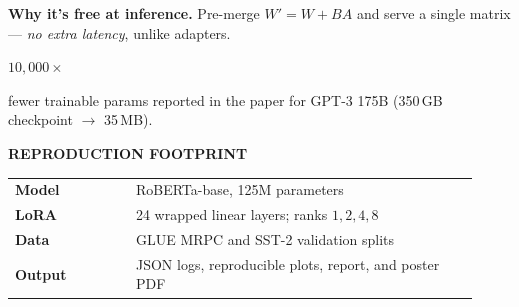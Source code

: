 \documentclass[landscape]{article}
\newcommand{\panelhead}[1]{%
  \par\vspace{2mm}%
  {\fontsize{15pt}{17pt}\selectfont\bfseries\color{slate}\MakeUppercase{#1}}\par
  \vspace{1mm}%
}
\newcommand{\bignum}[2]{%
  \begin{accentbox}\centering
    {\fontsize{42pt}{46pt}\selectfont\bfseries\color{accent}#1}\par
    \vspace{1mm}
    {\fontsize{14pt}{17pt}\selectfont #2}
  \end{accentbox}%
}
\begin{document}
\begin{minipage}[t]{0.323\textwidth}
\vspace{2mm}
\textbf{Why it's free at inference.} Pre-merge $W' = W + BA$ and serve a single matrix --- \emph{no extra latency}, unlike adapters.

\vspace{4mm}
\bignum{$10{,}000\times$}{fewer trainable params reported in the paper for GPT-3 175B (350\,GB checkpoint $\to$ 35\,MB).}

\vspace{3mm}
\panelhead{Reproduction footprint}
\begin{pbox}
\begin{tabular}{@{}p{0.24\linewidth}p{0.68\linewidth}@{}}
\textbf{Model} & RoBERTa-base, 125M parameters \\
\textbf{LoRA} & 24 wrapped linear layers; ranks $1,2,4,8$ \\
\textbf{Data} & GLUE MRPC and SST-2 validation splits \\
\textbf{Output} & JSON logs, reproducible plots, report, and poster PDF
\end{tabular}
\end{pbox}

\end{minipage}%
\hspace{0.012\textwidth}%
\end{document}
